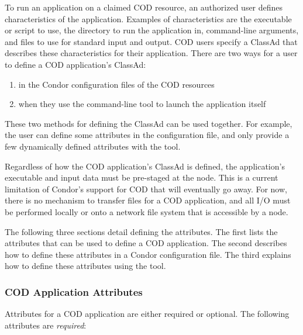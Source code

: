 To run an application on a claimed COD resource,
an authorized user defines 
characteristics of the application.
Examples of characteristics are the executable or script to use,
the directory to run the application in,
command-line arguments, and
files to use for standard input and output.
COD users specify a ClassAd that describes these characteristics
for their application.  
There are two ways for a user to define a COD application's ClassAd:

\begin{enumerate}
\item in the Condor configuration files of the COD resources
\item when they use the  command-line tool to launch the
application itself
\end{enumerate}

These two methods for defining the ClassAd can be used together.
For example, the user can define some attributes
in the configuration file, and only provide a few dynamically defined
attributes with the  tool.

Regardless of how the COD application's ClassAd is defined,
the application's executable and input
data must be pre-staged at the node.
This is a current limitation of Condor's support for COD that will
eventually go away.
For now, there is no mechanism to transfer files for a COD
application, and all I/O must be performed locally or onto a network
file system that is accessible by a node.

The following three sections detail defining the attributes.
The first lists the attributes that can be used to define a COD
application.
The second describes how to define these attributes in a Condor
configuration file.
The third explains how to define these attributes using the  tool.


\subsubsection{\label{sec:cod-application-attributes}
COD Application Attributes}


Attributes for a COD application are either required
or optional.
The following attributes are \emph{required}:

